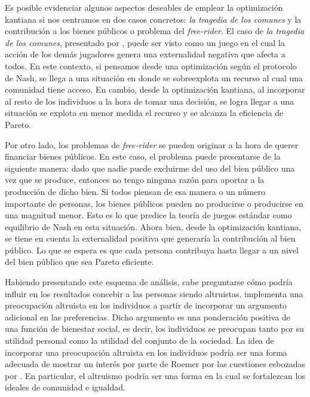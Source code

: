 Es posible evidenciar algunos aspectos deseables de emplear la optimización kantiana si nos centramos en dos casos concretos: \textit{la tragedia de los comunes} y la contribución a los bienes públicos o problema del \textit{free-rider}. El caso de \textit{la tragedia de los comunes}, presentado por \citet{Hardin_1968}, puede ser visto como un juego en el cual la acción de los demás jugadores genera una externalidad negativa que afecta a todos. En este contexto, si pensamos desde una optimización según el protocolo de Nash, se llega a una situación en donde se sobreexplota un recurso al cual una comunidad tiene acceso. En cambio, desde la optimización kantiana, al incorporar al resto de los individuos a la hora de tomar una decisión, se logra llegar a una situación se explota en menor medida el recurso y se alcanza la eficiencia de Pareto.

Por otro lado, los problemas de \textit{free-rider} se pueden originar a la hora de querer financiar bienes públicos. En este caso, el problema puede presentarse de la siguiente manera: dado que nadie puede excluirme del uso del bien público una vez que se produce, entonces no tengo ninguna razón para aportar a la producción de dicho bien. Si todos piensan de esa manera o un número importante de personas, los bienes públicos pueden no producirse o producirse en una magnitud menor. Esto es lo que predice la teoría de juegos estándar como equilibrio de Nash en esta situación. Ahora bien, desde la optimización kantiana, se tiene en cuenta la externalidad positiva que generaría la contribución al bien público. Lo que se espera es que cada persona contribuya hasta llegar a un nivel del bien público que sea Pareto eficiente.

Habiendo presentando este esquema de análisis, cabe preguntarse cómo podría influir en los resultados concebir a las personas siendo altruistas. \citet{Roemer_2019} implementa una preocupación altruista en los individuos a partir de incorporar un argumento adicional en las preferencias. Dicho argumento es una ponderación positiva de una función de bienestar social, es decir, los individuos se preocupan tanto por su utilidad personal como la utilidad del conjunto de la sociedad. La idea de incorporar una preocupación altruista en los individuos podría ser una forma adecuada de mostrar un interés por parte de Roemer por las cuestiones esbozadas por \citet{Cohen_2014c}. En particular, el altruismo podría ser una forma en la cual se fortalezcan los ideales de comunidad e igualdad. 

